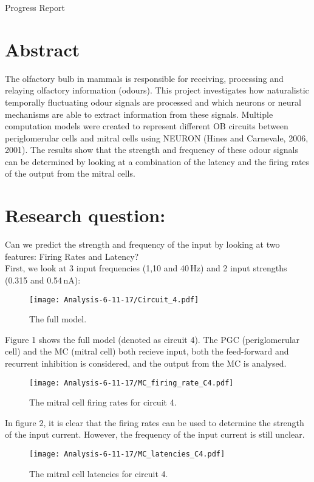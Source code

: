 \documentclass[11pt]{report}
\begin{document}
\begin{center}
{\Huge Progress Report}
\end{center}
\section*{Abstract}
The olfactory bulb in mammals is responsible for receiving, processing and relaying olfactory information (odours). This project investigates how naturalistic temporally fluctuating odour signals are processed and which neurons 
or neural mechanisms are able to extract information from these signals. Multiple computation models were created to represent different OB circuits between periglomerular cells and mitral cells using NEURON (Hines and Carnevale, 2006, 2001). 
The results show that the strength and frequency of these odour signals can be determined by looking at a combination of the latency and the firing rates of the output from the mitral cells. 

\section*{Research question:}
Can we predict the strength and frequency of the input by looking at two features: Firing Rates and Latency?\\

First, we look at 3 input frequencies (1,10 and 40\,Hz) and 2 input strengths (0.315 and 0.54\,nA):
\begin{figure}[!ht]
\centering
\texttt{[image: Analysis-6-11-17/Circuit\_4.pdf]}
\caption{The full model.}
\end{figure} 

Figure 1 shows the full model (denoted as circuit 4). The PGC (periglomerular cell) and the MC (mitral cell) both recieve input, both the feed-forward and recurrent inhibition is considered, and the output from the MC is analysed. 
\newpage

\begin{figure}[!ht]
\centering
\texttt{[image: Analysis-6-11-17/MC\_firing\_rate\_C4.pdf]}
\caption{The mitral cell firing rates for circuit 4.}
\end{figure} 

In figure 2, it is clear that the firing rates can be used to determine the strength of the input current. However, the frequency of the input current is still unclear. 
\newpage

\begin{figure}[!ht]
\centering
\texttt{[image: Analysis-6-11-17/MC\_latencies\_C4.pdf]}
\caption{The mitral cell latencies for circuit 4.}
\end{figure} 
\end{document}
